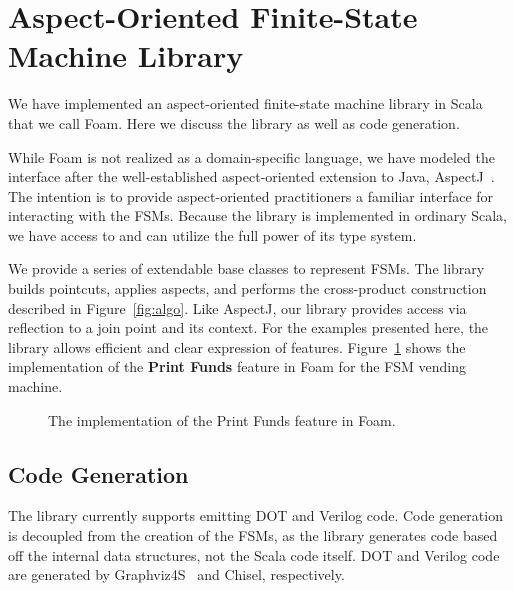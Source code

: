 \documentclass[sigplan,anonymous,review]{acmart}
\begin{document}

\section{Aspect-Oriented Finite-State Machine Library}\label{sec:foam}
We have implemented an aspect-oriented finite-state machine library in Scala that we call Foam. Here we discuss the library as well as code generation.

While Foam is not realized as a domain-specific language, we have modeled the interface after the well-established aspect-oriented extension to Java, AspectJ~\cite{aspectj}. The intention is to provide aspect-oriented practitioners a familiar interface for interacting with the FSMs. Because the library is implemented in ordinary Scala, we have access to and can utilize the full power of its type system. 

We provide a series of extendable base classes to represent FSMs. The library builds pointcuts, applies aspects, and performs the cross-product construction described in Figure~\ref{fig:algo}. Like AspectJ, our library provides access via reflection to a join point and its context.  For the examples presented here, the library allows efficient and clear expression of features.  Figure~\ref{lst:PrintFunds} shows the implementation of the \textbf{Print Funds} feature in Foam for the FSM vending machine.

\begin{figure}
    \centering
    
    \caption{The implementation of the Print Funds feature in Foam.}
    \label{lst:PrintFunds}
\end{figure}

\subsection{Code Generation}
The library currently supports emitting DOT and Verilog code. Code generation is decoupled from the creation of the FSMs, as the library generates code based off the internal data structures, not the Scala code itself. DOT and Verilog code are generated by Graphviz4S~\cite{Ldpe2G:19} and Chisel, respectively. 
\end{document}
